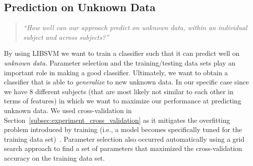 \subsection{Prediction on Unknown Data}
\label{subsec:experiment_prediction}
\begin{quote}
	\emph{``How well can our approach predict on unknown data, within an individual subject and across subjects?''}
\end{quote}

\noindent
By using LIBSVM we want to train a classifier such that it can predict well on \emph{unknown data}. Parameter selection and the training/testing data sets play an important role in making a good classifier. Ultimately, we want to obtain a classifier that is able to \emph{generalize} to new unknown data. In our specific case since we have 8 different subjects (that are most likely not similar to each other in terms of features) in which we want to maximize our performance at predicting unknown data. We used cross-validation in Section~\ref{subsec:experiment_cross_validation} as it mitigates the overfitting problem introduced by training (i.e., a model becomes specifically tuned for the training data set)~\cite{HCL03}. Parameter selection also occurred automatically using a grid search approach to find a set of parameters that maximized the cross-validation accuracy on the training data set.

